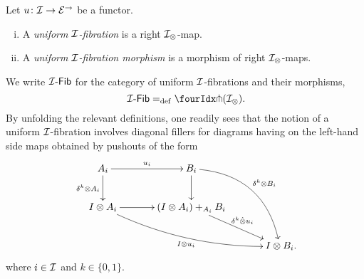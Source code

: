\documentclass[reqno,10pt,a4paper,oneside,draft]{amsart}
\begin{document}
\begin{definition} \label{def:I-fibration}
Let $u \co \cal{I} \to \catE^\to$ be a functor.
\begin{enumerate}[(i)]
\item A \emph{uniform $\cal{I}$-fibration} is a right $\cal{I}_\otimes$-map.
\item A \emph{uniform $\cal{I}$-fibration morphism} is a morphism of right $\cal{I}_\otimes$-maps.
\end{enumerate}
\end{definition}

We write $\Fib[\cal{I}]$ for the category of uniform $\cal{I}$-fibrations and their morphisms, \ie
\[
\Fib[\cal{I}] \defeq \liftr{(\cal{I}_\otimes)} \rlap{.}
\]
By unfolding the relevant definitions, one readily sees that the notion of a uniform $\cal{I}$-fibration involves diagonal fillers for diagrams having on the left-hand side maps obtained by pushouts of the form
\begin{gather*}
\xymatrix@C=1.2cm{
  A_i \ar[r]^{u_i} \ar[d]_{\kcyl \otimes A_i} & B_i \ar@/^2pc/[ddr]^{\kcyl \otimes B_i} \ar[d] & \\
  \interval \otimes A_i \ar@/_1pc/[drr]_{\interval \otimes u_i} \ar[r] & (\interval \otimes A_i) +_{A_i} B_i \ar[dr]^-{\delta^k \hatotimes u_i} & \\
  & & \interval \otimes B_i
\rlap{.}}
\end{gather*}
where $i \in \cal{I}$ and $k \in \{0, 1 \}$.
\end{document}
